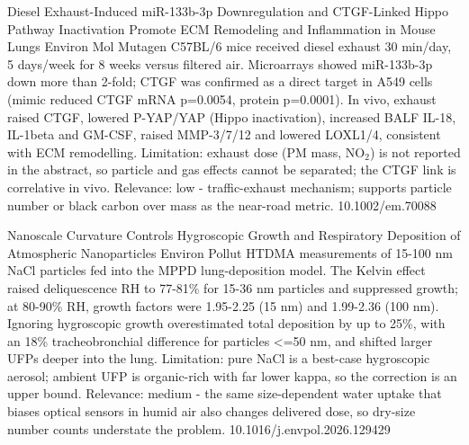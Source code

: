 \documentclass[10pt]{article}
\begin{document}
{Diesel Exhaust-Induced miR-133b-3p Downregulation and CTGF-Linked Hippo Pathway Inactivation Promote ECM Remodeling and Inflammation in Mouse Lungs}
{Environ Mol Mutagen}
{C57BL/6 mice received diesel exhaust 30 min/day, 5 days/week for 8 weeks versus filtered air. Microarrays showed miR-133b-3p down more than 2-fold; CTGF was confirmed as a direct target in A549 cells (mimic reduced CTGF mRNA p=0.0054, protein p=0.0001). In vivo, exhaust raised CTGF, lowered P-YAP/YAP (Hippo inactivation), increased BALF IL-18, IL-1beta and GM-CSF, raised MMP-3/7/12 and lowered LOXL1/4, consistent with ECM remodelling. Limitation: exhaust dose (PM mass, NO$_2$) is not reported in the abstract, so particle and gas effects cannot be separated; the CTGF link is correlative in vivo. Relevance: low - traffic-exhaust mechanism; supports particle number or black carbon over mass as the near-road metric.}
{10.1002/em.70088}

\par{}\baselineskip{}\baselineskip
{}

{Nanoscale Curvature Controls Hygroscopic Growth and Respiratory Deposition of Atmospheric Nanoparticles}
{Environ Pollut}
{HTDMA measurements of 15-100 nm NaCl particles fed into the MPPD lung-deposition model. The Kelvin effect raised deliquescence RH to 77-81\% for 15-36 nm particles and suppressed growth; at 80-90\% RH, growth factors were 1.95-2.25 (15 nm) and 1.99-2.36 (100 nm). Ignoring hygroscopic growth overestimated total deposition by up to 25\%, with an 18\% tracheobronchial difference for particles <=50 nm, and shifted larger UFPs deeper into the lung. Limitation: pure NaCl is a best-case hygroscopic aerosol; ambient UFP is organic-rich with far lower kappa, so the correction is an upper bound. Relevance: medium - the same size-dependent water uptake that biases optical sensors in humid air also changes delivered dose, so dry-size number counts understate the problem.}
{10.1016/j.envpol.2026.129429}
\end{document}
